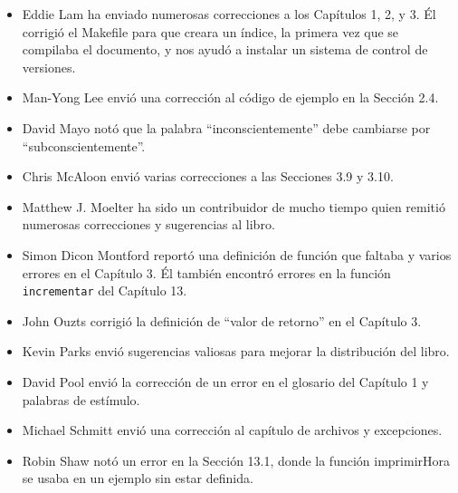 \begin{itemize}
\item Eddie Lam ha enviado numerosas correcciones a los Capítulos 1, 2,
y 3. Él corrigió el Makefile para que creara un índice, la primera
vez que se compilaba el documento, y nos ayudó a instalar un sistema
de control de versiones.

\item Man-Yong Lee envió una corrección al código de ejemplo en la Sección
2.4.

\item David Mayo notó que la palabra ``inconscientemente'' debe cambiarse
por ``subconscientemente''.

\item Chris McAloon envió varias correcciones a las Secciones 3.9 y 3.10.

\item Matthew J. Moelter ha sido un contribuidor de mucho tiempo quien remitió
numerosas correcciones y sugerencias al libro.

\item Simon Dicon Montford reportó una definición de función que faltaba
y varios errores en el Capítulo 3. Él también encontró errores en
la función \texttt{incrementar} del Capítulo 13.

\item John Ouzts corrigió la definición de ``valor de retorno'' en el
Capítulo 3.

\item Kevin Parks envió sugerencias valiosas para mejorar la distribución
del libro.

\item David Pool envió la corrección de un error en el glosario del Capítulo
1 y palabras de estímulo.

\item Michael Schmitt envió una corrección al capítulo de archivos y excepciones.

\item Robin Shaw notó un error en la Sección 13.1, donde la función imprimirHora
se usaba en un ejemplo sin estar definida.


\end{itemize}
